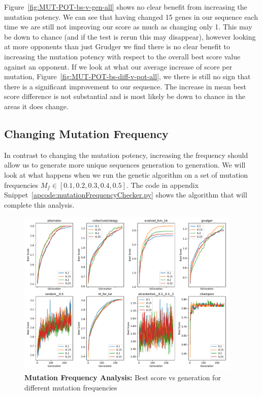 Figure~\ref{fig:MUT-POT-bs-v-gen-all} shows no clear benefit from increasing the mutation potency.
We can see that having changed 15 genes in our sequence each time we are still not improving our score as much as changing only 1.
This may be down to chance (and if the test is rerun this may disappear), however looking at more opponents than just Grudger we find there is no clear benefit to increasing the mutation potency with respect to the overall best score value against an opponent.
If we look at what our average increase of score per mutation, Figure~\ref{fig:MUT-POT-bs-diff-v-pot-all}, we there is still no sign that there is a significant improvement to our sequence.
The increase in mean best score difference is not substantial and is most likely be down to chance in the areas it does change.

\subsection{Changing Mutation Frequency}\label{subsec:changingMutationFrequency}
In contrast to changing the mutation potency, increasing the frequency should allow us to generate more unique sequences generation to generation.
We will look at what happens when we run the genetic algorithm on a set of mutation frequencies \(M_f \in [0.1,0.2,0.3,0.4,0.5]\).
The code in appendix Snippet~\ref{apcode:mutationFrequencyChecker.py} shows the algorithm that will complete this analysis.

\begin{figure}[ht]
    \includegraphics[width=0.95\textwidth, keepaspectratio, center]{./img/plots/MUT_FREQ_bs_v_gen_all.pdf}
    \caption{\textbf{Mutation Frequency Analysis:} Best score vs generation for different mutation frequencies}\label{fig:MUT-FREQ-bs-v-gen-all}
\end{figure}

